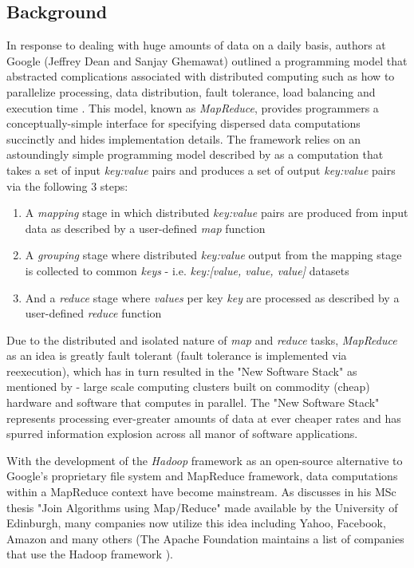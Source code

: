 \subsection{Background}

In response to dealing with huge amounts of data on a daily basis, authors at Google (Jeffrey Dean and Sanjay Ghemawat) outlined a programming model that abstracted complications associated with distributed computing such as how to parallelize processing, data distribution, fault tolerance, load balancing and execution time \cite{Dean:2008}. This model, known as \textit{MapReduce}, provides programmers a conceptually-simple interface for specifying dispersed data computations succinctly and hides implementation details. The framework relies on an astoundingly simple programming model described by \cite{Dean:2008} as a computation that takes a set of input \textit{key:value} pairs and produces a set of output \textit{key:value} pairs via the following 3 steps:

\begin{enumerate}
    \item A \textit{mapping} stage in which distributed \textit{key:value} pairs are produced from input data as described by a user-defined \textit{map} function
    \item A \textit{grouping} stage where distributed \textit{key:value} output from the mapping stage is collected to common \textit{keys} - i.e. \textit{key:[value, value, value]} datasets
    \item And a \textit{reduce} stage where \textit{values} per key \textit{key} are processed as described by a user-defined \textit{reduce} function
\end{enumerate}

Due to the distributed and isolated nature of \textit{map} and \textit{reduce} tasks, \textit{MapReduce} as an idea is greatly fault tolerant (fault tolerance is implemented via reexecution), which has in turn resulted in the "New Software Stack" as mentioned by \cite{mining2011} - large scale computing clusters built on commodity (cheap) hardware and software that computes in parallel. The "New Software Stack" represents processing ever-greater amounts of data at ever cheaper rates and has spurred information explosion across all manor of software applications.

With the development of the \textit{Hadoop} framework as an open-source alternative to Google's proprietary file system and MapReduce framework, data computations within a MapReduce context have become mainstream. As \cite{chandar2010} discusses in his MSc thesis "Join Algorithms using Map/Reduce" made available by the University of Edinburgh, many companies now utilize this idea including Yahoo, Facebook, Amazon and many others (The Apache Foundation maintains a list of companies that use the Hadoop framework \cite{hadoopPower:2017}).

